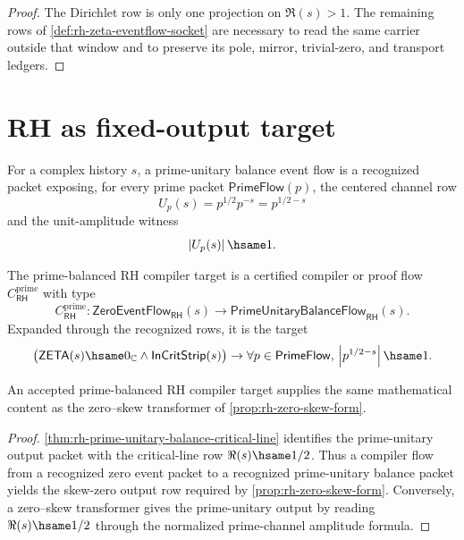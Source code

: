 \begin{proof}
The Dirichlet row is only one projection on $\Re(s)>1$.  The remaining rows of
\autoref{def:rh-zeta-eventflow-socket} are necessary to read the same carrier
outside that window and to preserve its pole, mirror, trivial-zero, and
transport ledgers.
\end{proof}

\section{RH as fixed-output target}
\label{sec:rh-as-fixed-output-target}

\begin{definition}
\label{def:rh-prime-unitary-balance-event-flow}
For a complex history $s$, a prime-unitary balance event flow is a recognized
packet exposing, for every prime packet $\mathsf{PrimeFlow}(p)$, the centered
channel row
$$
U_p(s)=p^{1/2}p^{-s}=p^{1/2-s}
$$
and the unit-amplitude witness
$$
\left|U_p(s)\right|\hsame 1.
$$
\end{definition}

\begin{definition}
\label{def:rh-prime-balanced-compiler-target}
The prime-balanced RH compiler target is a certified compiler or proof flow
$C_{\mathsf{RH}}^{\mathrm{prime}}$ with type
$$
C_{\mathsf{RH}}^{\mathrm{prime}}:
\mathsf{ZeroEventFlow}_{\mathsf{RH}}(s)
\to
\mathsf{PrimeUnitaryBalanceFlow}_{\mathsf{RH}}(s).
$$
Expanded through the recognized rows, it is the target
$$
\bigl(
\mathsf{ZETA}(s)\hsame 0_{\mathbb C}
\wedge
\mathsf{InCritStrip}(s)
\bigr)
\to
\forall p\in\mathsf{PrimeFlow},\,
\left|p^{1/2-s}\right|\hsame 1.
$$
\end{definition}

\begin{proposition}
\label{prop:rh-prime-balanced-compiler-target-witness}
An accepted prime-balanced RH compiler target supplies the same mathematical
content as the zero--skew transformer of \autoref{prop:rh-zero-skew-form}.
\end{proposition}

\begin{proof}
\autoref{thm:rh-prime-unitary-balance-critical-line} identifies the
prime-unitary output packet with the critical-line row $\Re(s)\hsame 1/2$.
Thus a compiler flow from a recognized zero event packet to a recognized
prime-unitary balance packet yields the skew-zero output row required by
\autoref{prop:rh-zero-skew-form}.  Conversely, a zero--skew transformer gives
the prime-unitary output by reading $\Re(s)\hsame 1/2$ through the normalized
prime-channel amplitude formula.
\end{proof}

